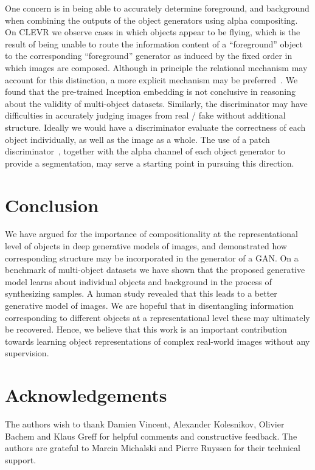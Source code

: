 \documentclass{article}
\begin{document}
One concern is in being able to accurately determine foreground, and background when combining the outputs of the object generators using alpha compositing.
On CLEVR we observe cases in which objects appear to be flying, which is the result of being unable to route the information content of a ``foreground'' object to the corresponding ``foreground'' generator as induced by the fixed order in which images are composed.
Although in principle the relational mechanism may account for this distinction, a more explicit mechanism may be preferred~\citep{mena2018learning}.
We found that the pre-trained Inception embedding is not conclusive in reasoning about the validity of multi-object datasets.
Similarly, the discriminator may have difficulties in accurately judging images from real / fake without additional structure.
Ideally we would have a discriminator evaluate the correctness of each object individually, as well as the image as a whole.
The use of a patch discriminator~\citep{isola2017image}, together with the alpha channel of each object generator to provide a segmentation, may serve a starting point in pursuing this direction.


\section{Conclusion}
We have argued for the importance of compositionality at the representational level of objects in deep generative models of images, and demonstrated how corresponding structure may be incorporated in the generator of a GAN.
On a benchmark of multi-object datasets we have shown that the proposed generative model learns about individual objects and background in the process of synthesizing samples.
A human study revealed that this leads to a better generative model of images.
We are hopeful that in disentangling information corresponding to different objects at a representational level these may ultimately be recovered.
Hence, we believe that this work is an important contribution towards learning object representations of complex real-world images without any supervision.

\section*{Acknowledgements}

The authors wish to thank Damien Vincent, Alexander Kolesnikov, Olivier Bachem and Klaus Greff for helpful comments and
constructive feedback.
The authors are grateful to Marcin Michalski and Pierre Ruyssen for their technical support.
\end{document}
